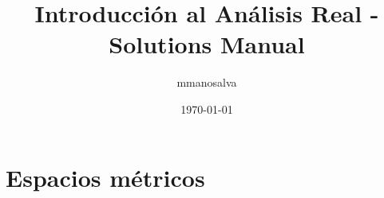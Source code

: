 \documentclass[12pt,a4paper]{report}
\title{Introducción al Análisis Real - Solutions Manual}
\author{mmanosalva}
\date{\today}
\begin{document}
\maketitle
\tableofcontents
\cleardoublepage

\chapter{Espacios métricos}

\end{document}
